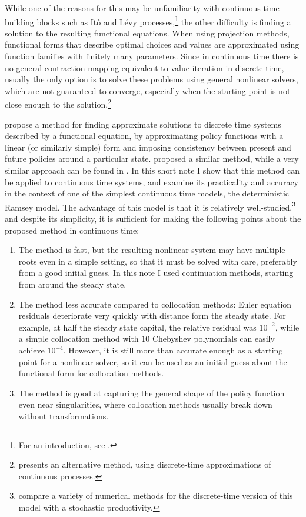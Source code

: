 \documentclass[a4paper,11pt]{article}
\begin{document}
While one of the reasons for this may be unfamiliarity with continuous-time building blocks such as Itô and Lévy processes,\footnote{For an introduction, see \textcite{oksendal2005applied}.} the other difficulty is finding a solution to the resulting functional equations. When using projection methods, functional forms that describe optimal choices and values are approximated using function families with finitely many parameters. Since in continuous time there is no general contraction mapping equivalent to value iteration in discrete time, usually the only option is to solve these problems using general nonlinear solvers, which are not guaranteed to converge, especially when the starting point is not close enough to the solution.\footnote{\textcite{kushner2013numerical} presents an alternative method, using discrete-time approximations of continuous processes.}

\textcite{den2015exact} propose a method for finding approximate solutions to discrete time systems described by a functional equation, by approximating policy functions with a linear (or similarly simple) form and imposing consistency between present and future policies around a particular state. \textcite{levintal2016taylor} proposed a similar method, while a very similar approach can be found in \textcite[Appendix B]{krusell2002equilibrium}. In this short note I show that this method can be applied to continuous time systems, and examine its practicality and accuracy in the context of one of the simplest continuous time models, the deterministic Ramsey model. The advantage of this model is that it is relatively well-studied,\footnote{\textcite{aruoba2006comparing} compare a variety of numerical methods for the discrete-time version of this model with a stochastic productivity.} and despite its simplicity, it is sufficient for making the following points about the proposed method in continuous time:
\begin{enumerate}
\item The method is fast, but the resulting nonlinear system may have multiple roots even in a simple setting, so that it must be solved with care, preferably from a good initial guess. In this note I used continuation methods, starting from around the steady state.
\item The method less accurate compared to collocation methods: Euler equation residuals deteriorate very quickly with distance form the steady state. For example, at half the steady state capital, the relative residual was $10^{-2}$, while a simple collocation method with $10$ Chebyshev polynomials can easily achieve $10^{-4}$. However, it is still more than accurate enough as a starting point for a nonlinear solver, so it can be used as an initial guess about the functional form for collocation methods.
\item The method is good at capturing the general shape of the policy function even near singularities, where collocation methods usually break down without transformations.
\end{enumerate}
\end{document}
